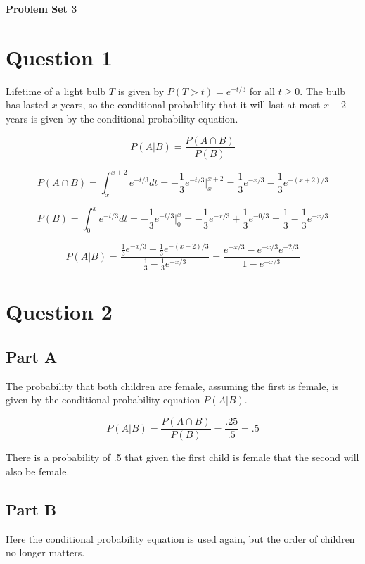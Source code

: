 \documentclass[letterpaper]{article}
\begin{document}
\vspace*{6pt}

\noindent \textbf{\huge{Problem Set 3}}

\bigskip

\section*{Question 1}

Lifetime of a light bulb $T$ is given by $P(T>t)=e^{-t/3}$ for all $t \geq 0$. The bulb has lasted $x$ years, so the conditional probability that it will last at most $x + 2$ years is given by the conditional probability equation.

 $$P(A|B) = \frac{P(A \cap B)}{P(B)}$$

$$P(A \cap B) = \int_x^{x+2} e^{-t/3} dt = -\frac{1}{3} e^{-t/3} \Big|_x^{x+2} = \frac{1}{3} e^{-x/3} - \frac{1}{3} e^{-(x+2)/3}$$

$$P(B) = \int_0^{x} e^{-t/3} dt = -\frac{1}{3} e^{-t/3} \Big|_0^{x} = - \frac{1}{3} e^{-x/3} + \frac{1}{3} e^{-0/3} = \frac{1}{3} - \frac{1}{3} e^{-x/3}$$

$$P(A|B) = \frac{\frac{1}{3} e^{-x/3} - \frac{1}{3} e^{-(x+2)/3}}{\frac{1}{3} - \frac{1}{3} e^{-x/3}} = \frac{e^{-x/3} - e^{-x/3} e^{-2/3}}{1 - e^{-x/3}}$$



\newpage

\section*{Question 2}

\subsection*{Part A}

The probability that both children are female, assuming the first is female, is given by the conditional probability equation $P(A|B)$.

$$P(A|B) = \frac{P(A \cap B)}{P(B)} = \frac{.25}{.5} = .5$$

There is a probability of .5 that given the first child is female that the second will also be female.

\subsection*{Part B}

Here the conditional probability equation is used again, but the order of  children no longer matters.
\end{document}
